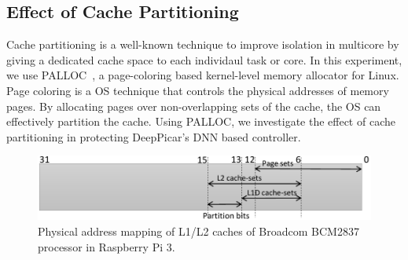 \subsection{Effect of Cache Partitioning}





Cache partitioning is a well-known technique to improve isolation in
multicore by giving a dedicated cache space to each individaul 
task or core. In this experiment, we use PALLOC~\cite{yun2014rtas}, a
page-coloring based kernel-level memory allocator for Linux.
Page coloring is a OS technique that controls the physical addresses
of memory pages. By allocating pages over non-overlapping sets of the
cache, the OS can effectively partition the cache.
Using PALLOC, we investigate the effect of cache partitioning in
protecting DeepPicar's DNN based controller.

\begin{figure} [h]
  \centering
  \includegraphics[width=.5\textwidth]{figs/cache-mapping}
  \caption{Physical address mapping of L1/L2 caches of Broadcom
    BCM2837 processor in Raspberry Pi 3.}
  \label{fig:cache-mapping}
\end{figure}

